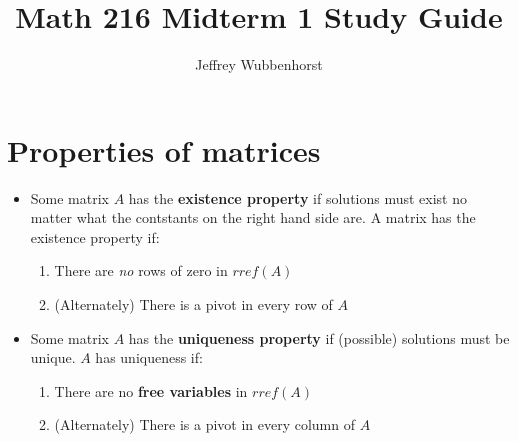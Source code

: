 \documentclass[10pt,letterpaper]{article}
\author{Jeffrey Wubbenhorst}
\title{Math 216 Midterm 1 Study Guide }
\begin{document}
\maketitle

\section*{Properties of matrices}

\begin{itemize}
\item Some matrix $A$ has the \textbf{existence property} if solutions must exist no matter what the 
contstants on the right hand side are. A matrix has the existence property if: 
\begin{enumerate}
\item There are \textit{no} rows of zero in $rref(A)$
\item (Alternately) There is a pivot in every row of $A$
\end{enumerate}

\item Some matrix $A$ has the \textbf{uniqueness property }if (possible) solutions must be unique. $A$ has uniqueness if: 
\begin{enumerate}
\item There are no \textbf{free variables} in $rref(A)$
\item (Alternately) There is a pivot in every column of $A$
\end{enumerate}

\end{itemize}
\end{document}
